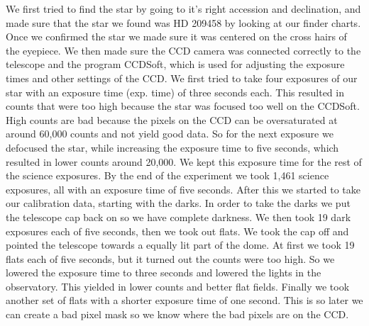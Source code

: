 \documentclass{aastex}
\begin{document}
We first tried to find the star by going to it's right accession and declination, and made sure that the star we found was HD 209458 by looking at our finder charts. Once we confirmed the star we made sure it was centered on the cross hairs of the eyepiece. We then made sure the CCD camera was connected correctly to the telescope and the program CCDSoft, which is used for adjusting the exposure times and other settings of the CCD. We first tried to take four exposures of our star with an exposure time (exp. time) of three seconds each. This resulted in counts that were too high because the star was focused too well on the CCDSoft. High counts are bad because the pixels on the CCD can be oversaturated at around 60,000 counts and not yield good data. So for the next exposure we defocused the star, while increasing the exposure time to five seconds, which resulted in lower counts around 20,000. We kept this exposure time for the rest of the science exposures. By the end of the experiment we took 1,461 science exposures, all with an exposure time of five seconds. After this we started to take our calibration data, starting with the darks. In order to take the darks we put the telescope cap back on so we have complete darkness. We then took 19 dark exposures each of five seconds, then we took out flats. We took the cap off and pointed the telescope towards a equally lit part of the dome. At first we took 19 flats each of five seconds, but it turned out the counts were too high. So we lowered the exposure time to three seconds and lowered the lights in the observatory. This yielded in lower counts and better flat fields. Finally we took another set of flats with a shorter exposure time of one second. This is so later we can create a bad pixel mask so we know where the bad pixels are on the CCD. 
\end{document}
